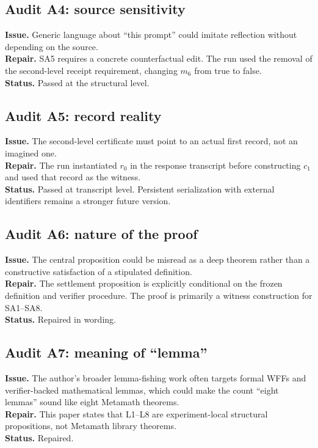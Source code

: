 \documentclass[11pt]{article}
\theoremstyle{remark}
\begin{document}
\subsection*{Audit A4: source sensitivity}
\textbf{Issue.} Generic language about ``this prompt'' could imitate reflection without depending on the source.\\
\textbf{Repair.} SA5 requires a concrete counterfactual edit. The run used the removal of the second-level receipt requirement, changing $m_6$ from true to false.\\
\textbf{Status.} Passed at the structural level.

\subsection*{Audit A5: record reality}
\textbf{Issue.} The second-level certificate must point to an actual first record, not an imagined one.\\
\textbf{Repair.} The run instantiated $r_0$ in the response transcript before constructing $c_1$ and used that record as the witness.\\
\textbf{Status.} Passed at transcript level. Persistent serialization with external identifiers remains a stronger future version.

\subsection*{Audit A6: nature of the proof}
\textbf{Issue.} The central proposition could be misread as a deep theorem rather than a constructive satisfaction of a stipulated definition.\\
\textbf{Repair.} The settlement proposition is explicitly conditional on the frozen definition and verifier procedure. The proof is primarily a witness construction for SA1--SA8.\\
\textbf{Status.} Repaired in wording.

\subsection*{Audit A7: meaning of ``lemma''}
\textbf{Issue.} The author's broader lemma-fishing work often targets formal WFFs and verifier-backed mathematical lemmas, which could make the count ``eight lemmas'' sound like eight Metamath theorems.\\
\textbf{Repair.} This paper states that L1--L8 are experiment-local structural propositions, not Metamath library theorems.\\
\textbf{Status.} Repaired.
\end{document}
